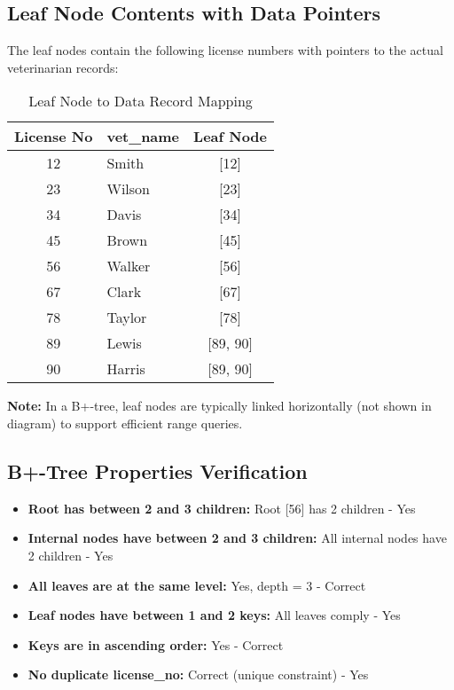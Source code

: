 \documentclass[12pt]{article}
\begin{document}
\newpage

\subsection{Leaf Node Contents with Data Pointers}

The leaf nodes contain the following license numbers with pointers to the actual veterinarian records:

\begin{table}[h]
\centering
\begin{tabular}{|c|l|c|}
\hline
\textbf{License No} & \textbf{vet\_name} & \textbf{Leaf Node} \\
\hline
12 & Smith & [12] \\
23 & Wilson & [23] \\
34 & Davis & [34] \\
45 & Brown & [45] \\
56 & Walker & [56] \\
67 & Clark & [67] \\
78 & Taylor & [78] \\
89 & Lewis & [89, 90] \\
90 & Harris & [89, 90] \\
\hline
\end{tabular}
\caption{Leaf Node to Data Record Mapping}
\end{table}

\textbf{Note:} In a B+-tree, leaf nodes are typically linked horizontally (not shown in diagram) to support efficient range queries.

\subsection{B+-Tree Properties Verification}

\begin{itemize}
    \item \textbf{Root has between 2 and 3 children:} Root [56] has 2 children - Yes
    \item \textbf{Internal nodes have between 2 and 3 children:} All internal nodes have 2 children - Yes
    \item \textbf{All leaves are at the same level:} Yes, depth = 3 - Correct
    \item \textbf{Leaf nodes have between 1 and 2 keys:} All leaves comply - Yes
    \item \textbf{Keys are in ascending order:} Yes - Correct
    \item \textbf{No duplicate license\_no:} Correct (unique constraint) - Yes
\end{itemize}
\end{document}
